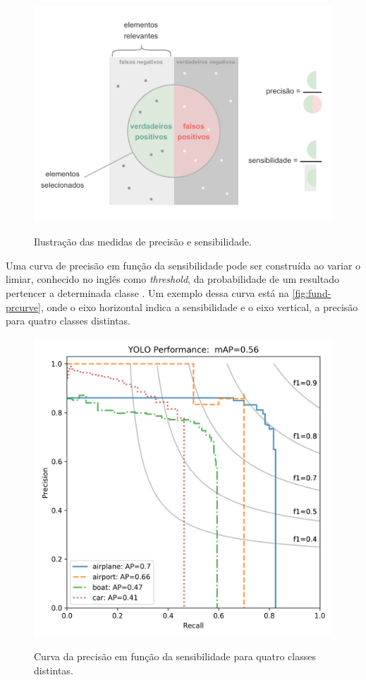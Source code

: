 \begin{figure}[h!] %
  \centering
  \caption{Ilustração das medidas de precisão e sensibilidade.}
  \includegraphics[scale=1.7]{img/img-fundamentacao-pr.pdf}
  \label{fig:fund-pr}
\end{figure}

Uma curva de precisão em função da sensibilidade pode ser construída ao variar o limiar, conhecido no inglês como \textit{threshold}, da probabilidade de um resultado pertencer a determinada classe \cite{ref:Steen}. Um exemplo dessa curva está na \autoref{fig:fund-prcurve}, onde o eixo horizontal indica a sensibilidade e o eixo vertical, a precisão para quatro classes distintas.

\begin{figure}[h!] %
  \centering
  \caption{Curva da precisão em função da sensibilidade para quatro classes distintas.}
  \includegraphics[scale=0.6]{img/img-fundamentacao-prcurve.png}
  \label{fig:fund-prcurve}
\end{figure}

